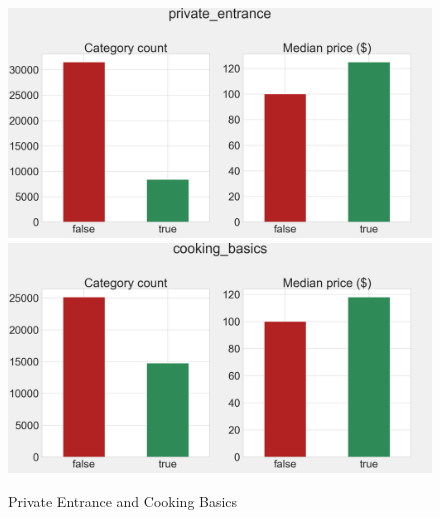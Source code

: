 \begin{figure}[H]
\centering
\caption{Private Entrance and Cooking Basics}
    \includegraphics[width=\linewidth]{figures/amenities/group1/private_entrance.png}
    \vspace{0.5cm}
    \includegraphics[width=\linewidth]{figures/amenities/group1/cooking_basics.png}
    \label{fig:private-entrance-and-cooking-basics}
\end{figure}


